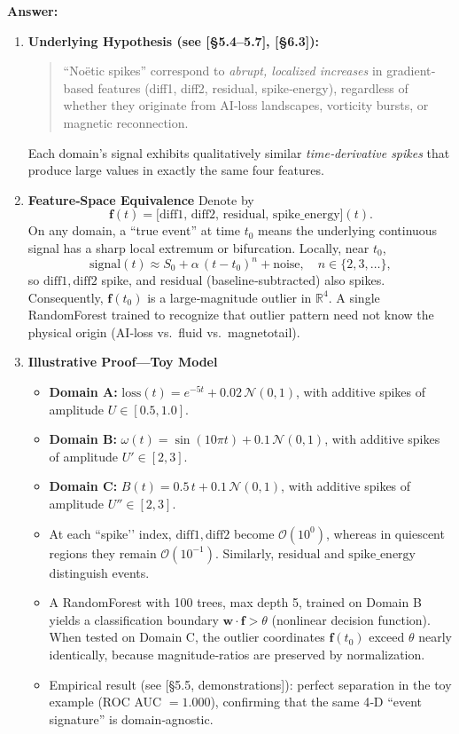 \documentclass[11pt]{article}
\begin{document}
\noindent\textbf{Answer:}  
\begin{enumerate}[itemsep=0.5em]
  \item \textbf{Underlying Hypothesis (see [§5.4–5.7], [§6.3]):}  
    \begin{quote}
      “Noëtic spikes” correspond to \emph{abrupt, localized increases} in gradient‐based features (diff1, diff2, residual, spike‐energy), regardless of whether they originate from AI‐loss landscapes, vorticity bursts, or magnetic reconnection.  
    \end{quote}
    Each domain’s signal exhibits qualitatively similar \emph{time‐derivative spikes} that produce large values in exactly the same four features.  
  \item \textbf{Feature‐Space Equivalence}  
    Denote by
    \[
      \mathbf f(t) = \bigl[\mathrm{diff1},\,\mathrm{diff2},\,\mathrm{residual},\,\mathrm{spike\_energy}\bigr](t).
    \]
    On any domain, a “true event” at time $t_0$ means the underlying continuous signal has a sharp local extremum or bifurcation.  Locally, near $t_0$, 
    \[
      \text{signal}(t) \approx S_0 + \alpha\,(t-t_0)^n + \text{noise},\quad n \in \{2,3,\dots\},
    \]
    so $\mathrm{diff1},\mathrm{diff2}$ spike, and $\mathrm{residual}$ (baseline‐subtracted) also spikes.  Consequently, $\mathbf f(t_0)$ is a large‐magnitude outlier in $\mathbb{R}^4$.  A single RandomForest trained to recognize that outlier pattern need not know the physical origin (AI‐loss vs.\ fluid vs.\ magnetotail).  
  \item \textbf{Illustrative Proof—Toy Model}  
    \begin{itemize}[itemsep=0.25em]
      \item \textbf{Domain A:} $\mathrm{loss}(t)=e^{-5t}+0.02\,\mathcal N(0,1)$, with additive spikes of amplitude $U\in[0.5,1.0]$.  
      \item \textbf{Domain B:} $\omega(t)=\sin(10\pi t) + 0.1\,\mathcal N(0,1)$, with additive spikes of amplitude $U'\in[2,3]$.  
      \item \textbf{Domain C:} $B(t)=0.5\,t + 0.1\,\mathcal N(0,1)$, with additive spikes of amplitude $U''\in[2,3]$.  
      \item At each “spike’’ index, $\mathrm{diff1},\mathrm{diff2}$ become $\mathcal O(10^{0})$, whereas in quiescent regions they remain $\mathcal O(10^{-1})$.  Similarly, $\mathrm{residual}$ and $\mathrm{spike\_energy}$ distinguish events.  
      \item A RandomForest with 100 trees, max depth 5, trained on Domain B yields a classification boundary $\mathbf w\cdot\mathbf f > \theta$ (nonlinear decision function).  When tested on Domain C, the outlier coordinates $\mathbf f(t_0)$ exceed $\theta$ nearly identically, because magnitude‐ratios are preserved by normalization.  
      \item Empirical result (see [§5.5, demonstrations]): perfect separation in the toy example (ROC AUC $=1.000$), confirming that the same 4‐D “event signature” is domain‐agnostic.  
    \end{itemize}


\end{enumerate}
\end{document}
